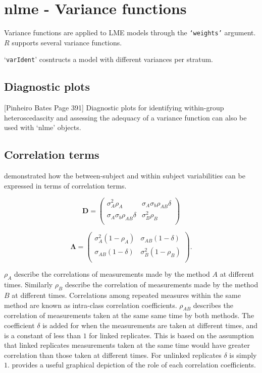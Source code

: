 \documentclass[12pt, a4paper]{article}
\begin{document}
\section{nlme - Variance functions}

Variance functions are applied to LME models through the \texttt{`weights'} argument. $R$ supports several variance functions.

`\texttt{varIdent}' cosntructs a model with different variances per stratum.

\subsection{Diagnostic plots}
[Pinheiro Bates Page 391] Diagnostic plots for identifying within-group heteroscedascity and assessing the adequacy of a variance function can also be used with `nlme' objects.




\subsection{Correlation terms}
\citet{hamlett} demonstrated how the between-subject and within subject variabilities can be expressed in terms of
correlation terms.

\[
\boldsymbol{D} = \left( \begin{array}{cc}
\sigma^2_{A}\rho_{A} & \sigma_{A}\sigma_{b}\rho_{AB}\delta \\
\sigma_{A}\sigma_{b}\rho_{AB}\delta & \sigma^2_{B}\rho_{B}\\

\end{array}\right)
\]

\[
\boldsymbol{\Lambda} = \left(
\begin{array}{cc}
\sigma^2_{A}(1-\rho_{A}) & \sigma_{AB}(1-\delta)  \\
\sigma_{AB}(1-\delta) & \sigma^2_{B}(1-\rho_{B}) \\
\end{array}\right).
\]

$\rho_{A}$ describe the correlations of measurements made by the method $A$ at different times. Similarly $\rho_{B}$ describe the correlation of measurements made by the method $B$ at different times. Correlations among repeated measures within the same method are known as intra-class correlation coefficients. $\rho_{AB}$ describes the correlation of measurements taken at the same same time by both methods. The coefficient $\delta$ is added for when the measurements are taken at different times, and is a constant of less than $1$ for linked replicates. This is based on the assumption that linked replicates measurements taken at the same time would have greater correlation than those taken at different times. For unlinked replicates $\delta$ is simply $1$. \citet{hamlett} provides a useful graphical depiction of the role of each correlation coefficients.
\end{document}
